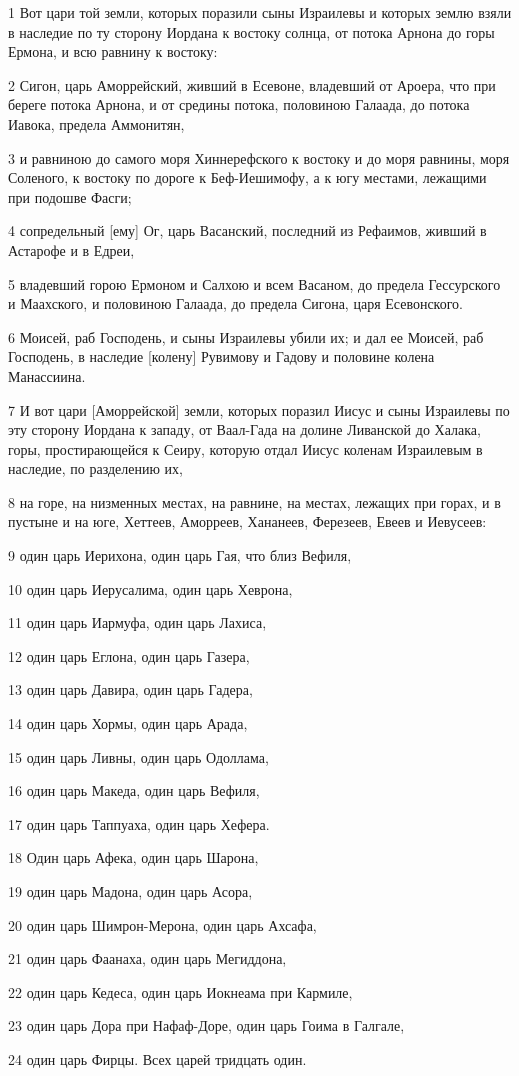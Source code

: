 \par 1 Вот цари той земли, которых поразили сыны Израилевы и которых землю взяли в наследие по ту сторону Иордана к востоку солнца, от потока Арнона до горы Ермона, и всю равнину к востоку:
\par 2 Сигон, царь Аморрейский, живший в Есевоне, владевший от Ароера, что при береге потока Арнона, и от средины потока, половиною Галаада, до потока Иавока, предела Аммонитян,
\par 3 и равниною до самого моря Хиннерефского к востоку и до моря равнины, моря Соленого, к востоку по дороге к Беф-Иешимофу, а к югу местами, лежащими при подошве Фасги;
\par 4 сопредельный [ему] Ог, царь Васанский, последний из Рефаимов, живший в Астарофе и в Едреи,
\par 5 владевший горою Ермоном и Салхою и всем Васаном, до предела Гессурского и Маахского, и половиною Галаада, до предела Сигона, царя Есевонского.
\par 6 Моисей, раб Господень, и сыны Израилевы убили их; и дал ее Моисей, раб Господень, в наследие [колену] Рувимову и Гадову и половине колена Манассиина.
\par 7 И вот цари [Аморрейской] земли, которых поразил Иисус и сыны Израилевы по эту сторону Иордана к западу, от Ваал-Гада на долине Ливанской до Халака, горы, простирающейся к Сеиру, которую отдал Иисус коленам Израилевым в наследие, по разделению их,
\par 8 на горе, на низменных местах, на равнине, на местах, лежащих при горах, и в пустыне и на юге, Хеттеев, Аморреев, Хананеев, Ферезеев, Евеев и Иевусеев:
\par 9 один царь Иерихона, один царь Гая, что близ Вефиля,
\par 10 один царь Иерусалима, один царь Хеврона,
\par 11 один царь Иармуфа, один царь Лахиса,
\par 12 один царь Еглона, один царь Газера,
\par 13 один царь Давира, один царь Гадера,
\par 14 один царь Хормы, один царь Арада,
\par 15 один царь Ливны, один царь Одоллама,
\par 16 один царь Македа, один царь Вефиля,
\par 17 один царь Таппуаха, один царь Хефера.
\par 18 Один царь Афека, один царь Шарона,
\par 19 один царь Мадона, один царь Асора,
\par 20 один царь Шимрон-Мерона, один царь Ахсафа,
\par 21 один царь Фаанаха, один царь Мегиддона,
\par 22 один царь Кедеса, один царь Иокнеама при Кармиле,
\par 23 один царь Дора при Нафаф-Доре, один царь Гоима в Галгале,
\par 24 один царь Фирцы. Всех царей тридцать один.


